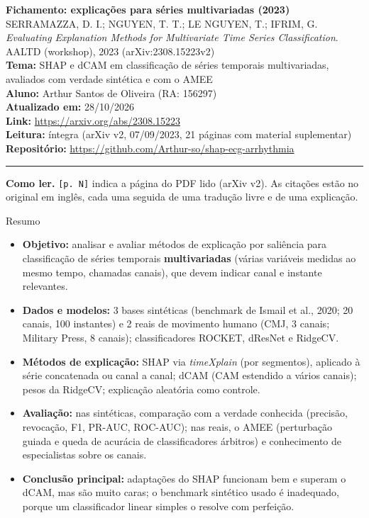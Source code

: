 \documentclass[11pt,a4paper]{article}
\begin{document}
\begin{center}
    {\LARGE \textbf{Fichamento: explicações para séries multivariadas (2023)}} \\[0.35em]
    {\large SERRAMAZZA, D. I.; NGUYEN, T. T.; LE NGUYEN, T.; IFRIM, G. \textit{Evaluating Explanation Methods for Multivariate Time Series Classification}. AALTD (workshop), 2023 (arXiv:2308.15223v2)} \\[0.3em]
    \textbf{Tema:} SHAP e dCAM em classificação de séries temporais multivariadas, avaliados com verdade sintética e com o AMEE \\[0.2em]
    \textbf{Aluno:} Arthur Santos de Oliveira (RA: 156297) \\[0.2em]
    \textbf{Atualizado em:} 28/10/2026 \\[0.2em]
    \textbf{Link:} \url{https://arxiv.org/abs/2308.15223} \\[0.2em]
    \textbf{Leitura:} íntegra (arXiv v2, 07/09/2023, 21 páginas com material suplementar) \\[0.2em]
    \textbf{Repositório:} \url{https://github.com/Arthur-so/shap-ecg-arrhythmia}
\end{center}
\vspace{-0.5em}
\hrule
\vspace{0.8em}

\textbf{Como ler.} \texttt{[p. N]} indica a página do PDF lido (arXiv v2). As citações estão no original em inglês, cada uma seguida de uma tradução livre e de uma explicação.

\begin{infobox}[note]{Resumo}
\begin{itemize}
\item \textbf{Objetivo:} analisar e avaliar métodos de explicação por saliência para classificação de séries temporais \textbf{multivariadas} (várias variáveis medidas ao mesmo tempo, chamadas canais), que devem indicar canal e instante relevantes.
\item \textbf{Dados e modelos:} 3 bases sintéticas (benchmark de Ismail et al., 2020; 20 canais, 100 instantes) e 2 reais de movimento humano (CMJ, 3 canais; Military Press, 8 canais); classificadores ROCKET, dResNet e RidgeCV.
\item \textbf{Métodos de explicação:} SHAP via \textit{timeXplain} (por segmentos), aplicado à série concatenada ou canal a canal; dCAM (CAM estendido a vários canais); pesos da RidgeCV; explicação aleatória como controle.
\item \textbf{Avaliação:} nas sintéticas, comparação com a verdade conhecida (precisão, revocação, F1, PR-AUC, ROC-AUC); nas reais, o AMEE (perturbação guiada e queda de acurácia de classificadores árbitros) e conhecimento de especialistas sobre os canais.
\item \textbf{Conclusão principal:} adaptações do SHAP funcionam bem e superam o dCAM, mas são muito caras; o benchmark sintético usado é inadequado, porque um classificador linear simples o resolve com perfeição.
\end{itemize}
\end{infobox}
\end{document}
